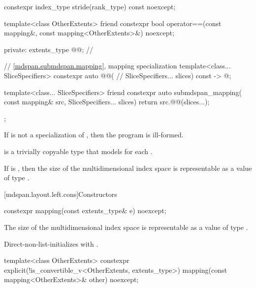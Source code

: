 \begin{codeblock}
{{    constexpr index_type stride(rank_type) const noexcept;

    template<class OtherExtents>
      friend constexpr bool operator==(const mapping&, const mapping<OtherExtents>&) noexcept;

  private:
    extents_type @@{};    // \expos

    // \ref{mdspan.submdspan.mapping},  mapping specialization
    template<class... SliceSpecifiers>
      constexpr auto @@(                    // \expos
        SliceSpecifiers... slices) const -> @\seebelow@;

    template<class... SliceSpecifiers>
      friend constexpr auto submdspan_mapping(
        const mapping& src, SliceSpecifiers... slices) {
          return src.@@(slices...);
      }
  };
}
\end{codeblock}

\pnum
If  is not a specialization of ,
then the program is ill-formed.

\pnum
{} is a trivially copyable type
that models  for each .

\pnum
\mandates
If  is ,
then the size of the multidimensional index space 
is representable as a value of type .

[mdspan.layout.left.cons]{Constructors}

%
\begin{itemdecl}
constexpr mapping(const extents_type& e) noexcept;
\end{itemdecl}

\begin{itemdescr}
\pnum
\expects
The size of the multidimensional index space 
is representable as a value of type .

\pnum
\effects
Direct-non-list-initializes  with .
\end{itemdescr}

%
\begin{itemdecl}
template<class OtherExtents>
  constexpr explicit(!is_convertible_v<OtherExtents, extents_type>)
    mapping(const mapping<OtherExtents>& other) noexcept;
\end{itemdecl}

